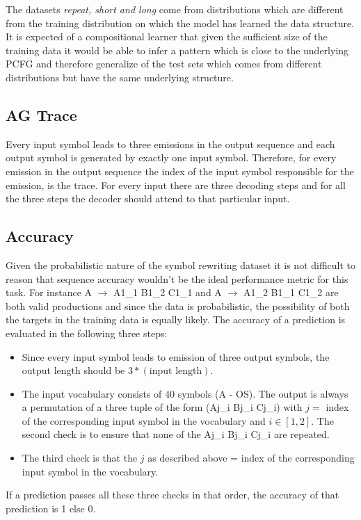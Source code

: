 The datasets \textit{repeat, short and long} come from distributions which are different from the training distribution on which the model has learned the data structure. It is expected of a compositional learner that given the sufficient size of the training data it would be able to infer a pattern which is close to the underlying PCFG and therefore generalize of the test sets which comes from different distributions but have the same underlying structure.

\subsection{AG Trace}\label{sr:trace}
Every input symbol leads to three emissions in the output sequence and each output symbol is generated by exactly one input symbol. Therefore, for every emission in the output sequence the index of the input symbol responsible for the emission, is the trace. For every input there are three decoding steps and for all the three steps the decoder should attend to that particular input.


\subsection{Accuracy}\label{sr:acc_desc}
Given the probabilistic nature of the symbol rewriting dataset it is not difficult to reason that sequence accuracy wouldn't be the ideal performance metric for this task. For instance A $\rightarrow$ A1\_1 B1\_2 C1\_1 and A $\rightarrow$ A1\_2 B1\_1 C1\_2 are both valid productions and since the data is probabilistic, the possibility of both the targets in the training data is equally likely. The accuracy of a prediction is evaluated in the following three steps:
\begin{itemize}
	\item Since every input symbol leads to emission of three output symbols, the output length should be $3*(\text{input length})$.
	\item The input vocabulary consists of 40 symbols (A - OS). The output is always a permutation of a three tuple of the form (Aj\_i Bj\_i Cj\_i) with $j=$ index of the corresponding input symbol in the vocabulary and $i \in [1, 2] $. The second check is to ensure that none of the Aj\_i Bj\_i Cj\_i are repeated.
	\item The third check is that the $j$ as described above = index of the corresponding input symbol in the vocabulary.
\end{itemize}
If a prediction passes all these three checks in that order, the accuracy of that prediction is 1 else 0.

